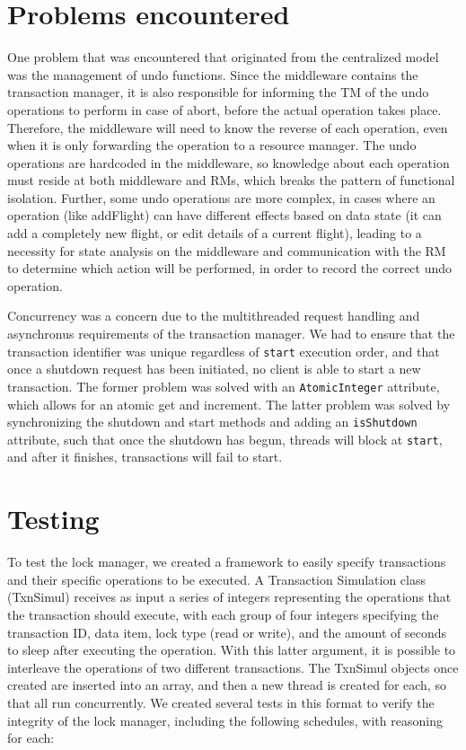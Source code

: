 \documentclass[11pt]{article}
\begin{document}
\section*{Problems encountered}

One problem that was encountered that originated from the centralized model was the management of undo functions. Since the middleware contains the transaction manager, it is also responsible for informing the TM of the undo operations to perform in case of abort, before the actual operation takes place. Therefore, the middleware will need to know the reverse of each operation, even when it is only forwarding the operation to a resource manager. The undo operations are hardcoded in the middleware, so knowledge about each operation must reside at both middleware and RMs, which breaks the pattern of functional isolation. Further, some undo operations are more complex, in cases where an operation (like addFlight) can have different effects based on data state (it can add a completely new flight, or edit details of a current flight), leading to a necessity for state analysis on the middleware and communication with the RM to determine which action will be performed, in order to record the correct undo operation.

Concurrency was a concern due to the multithreaded request handling and asynchronus requirements of the transaction manager. We had to ensure that the transaction identifier was unique regardless of \texttt{start} execution order, and that once a shutdown request has been initiated, no client is able to start a new transaction. The former problem was solved with an \texttt{AtomicInteger} attribute, which allows for an atomic get and increment. The latter problem was solved by synchronizing the shutdown and start methods and adding an \texttt{isShutdown} attribute, such that once the shutdown has begun, threads will block at \texttt{start}, and after it finishes, transactions will fail to start.

\section*{Testing}

To test the lock manager, we created a framework to easily specify transactions and their specific operations to be executed. A Transaction Simulation class (TxnSimul) receives as input a series of integers representing the operations that the transaction should execute, with each group of four integers specifying the transaction ID, data item, lock type (read or write), and the amount of seconds to sleep after executing the operation. With this latter argument, it is possible to interleave the operations of two different transactions. The TxnSimul objects once created are inserted into an array, and then a new thread is created for each, so that all run concurrently. We created several tests in this format to verify the integrity of the lock manager, including the following schedules, with reasoning for each:
\end{document}
